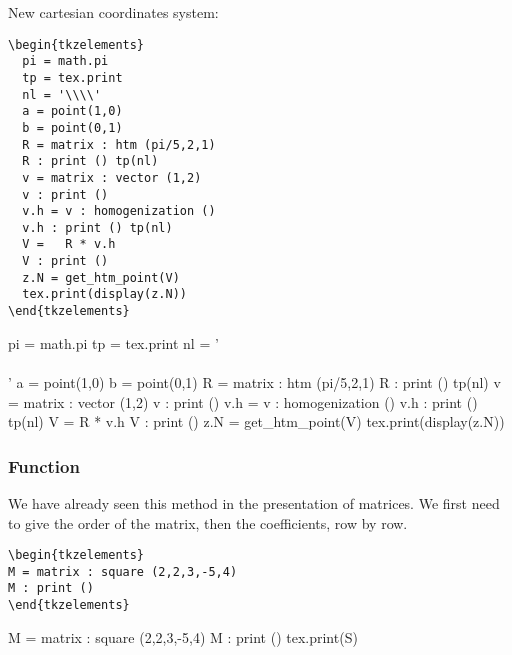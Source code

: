 \vspace{.5 em}

New  cartesian coordinates system:

\vspace{.5 em}
\begin{minipage}{.5\textwidth}
\begin{verbatim}
\begin{tkzelements}
  pi = math.pi
  tp = tex.print
  nl = '\\\\'
  a = point(1,0)
  b = point(0,1)
  R = matrix : htm (pi/5,2,1)
  R : print () tp(nl)
  v = matrix : vector (1,2)
  v : print ()
  v.h = v : homogenization ()
  v.h : print () tp(nl)
  V =   R * v.h
  V : print ()
  z.N = get_htm_point(V)
  tex.print(display(z.N))
\end{tkzelements}
\end{verbatim}
\end{minipage}
\begin{minipage}{.5\textwidth}
    \begin{tkzelements}
    pi = math.pi
    tp = tex.print
    nl = '\\\\'
    a = point(1,0)
    b = point(0,1)
    R = matrix : htm (pi/5,2,1)
    R : print () tp(nl)
    v = matrix : vector (1,2)
    v : print ()
    v.h = v : homogenization ()
    v.h : print () tp(nl)
    V =   R * v.h
    V : print ()
    z.N = get_htm_point(V)
    tex.print(display(z.N))
    \end{tkzelements}
\end{minipage}




\subsubsection{Function } %
\label{ssub:method_square}

We have already seen this method in the presentation of matrices. We first need to give the order of the matrix, then the coefficients, row by row.

\begin{minipage}{.5\textwidth}
\begin{Verbatim}
\begin{tkzelements}
M = matrix : square (2,2,3,-5,4)
M : print ()
\end{tkzelements}
\end{Verbatim}
\end{minipage}
\begin{minipage}{.5\textwidth}
\begin{tkzelements}
M = matrix : square (2,2,3,-5,4)
M : print ()
tex.print(S)
\end{tkzelements}
\end{minipage}

